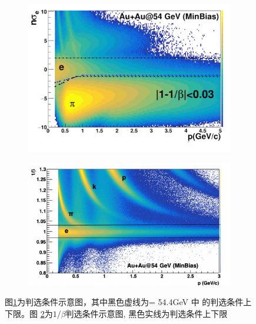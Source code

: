\begin{figure}[htb]
    \centering
    \begin{subfigure}[b]{0.45\textwidth}
        \centering
        \includegraphics[width=\textwidth,clip]{figures/Chapter4/nSigmaEwTOF.png}
        \caption{}
        \label{fig:nSigmaEwTOF}
    \end{subfigure}
    \hfill
    \begin{subfigure}[b]{0.49\textwidth}
        \centering
        \includegraphics[width=\textwidth,clip]{figures/Chapter4/beta_Cut.png}
        \caption{}
        \label{fig:beta_Cut}
    \end{subfigure}
       \caption[\nSigmaE 和 $1/\beta$判选条件示意图]{图\ref{fig:nSigmaEwTOF}为\nSigmaE 判选条件示意图，其中黑色虚线为\sNN = 54.4GeV 中 \nSigmaE 的判选条件上下限。图 \ref{fig:beta_Cut}为$1/\beta$判选条件示意图, 黑色实线为判选条件上下限 }
       \label{fig:eID_cut}
\end{figure}

